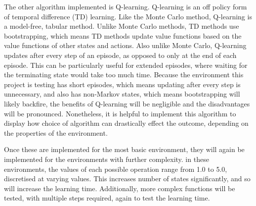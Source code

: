 The other algorithm implemented is Q-learning. Q-learning is an off policy form of temporal difference (TD) learning. Like the Monte Carlo method, Q-learning is a model-free, tabular method. Unlike Monte Carlo methods, TD methods use bootstrapping, which means TD methods update value functions based on the value functions of other states and actions. Also unlike Monte Carlo, Q-learning updates after every step of an episode, as opposed to only at the end of each episode. This can be particularly useful for extended episodes, where waiting for the terminating state would take too much time. Because the environment this project is testing has short episodes, which means updating after every step is unnecessary, and also has non-Markov states, which means bootstrapping will likely backfire, the benefits of Q-learning will be negligible and the disadvantages will be pronounced. Nonetheless, it is helpful to implement this algorithm to display how choice of algorithm can drastically effect the outcome, depending on the properties of the environment.

Once these are implemented for the most basic environment, they will again be implemented for the environments with further complexity. in these environments, the values of each possible operation range from 1.0 to 5.0, discretised at varying values. This increases number of states significantly, and so will increase the learning time. Additionally, more complex functions will be tested, with multiple steps required, again to test the learning time.